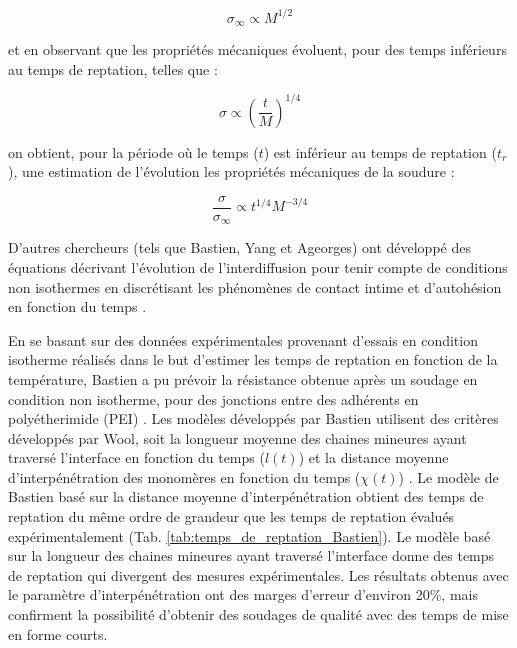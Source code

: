\begin{equation}
\sigma_{\infty} \propto M^{1/2}
\end{equation}

et en observant que les propriétés mécaniques évoluent, pour des temps inférieurs au temps de reptation, telles que \cite{Wool1983} :

\begin{equation}
\sigma \propto \left( \frac{t}{M} \right) ^{1/4}
\end{equation}

on obtient, pour la période où le temps ($t$) est inférieur au temps de reptation ($t_r$), une estimation de l'évolution les propriétés mécaniques de la soudure \cite{Wool1983} : 

\begin{equation}
\frac{\sigma}{\sigma_{\infty}} \propto t^{1/4} M^{-3/4}
\end{equation}

D'autres chercheurs (tels que Bastien, Yang et Ageorges) ont développé des équations décrivant l'évolution de l'interdiffusion pour tenir compte de conditions non isothermes en discrétisant les phénomènes de contact intime et d'autohésion en fonction du temps  \cite{Bastien1991,F.Yang2002,Ageorges1998}. 

En se basant sur des données expérimentales provenant d'essais en condition isotherme réalisés dans le but d'estimer les temps de reptation en fonction de la température, Bastien a pu prévoir la résistance obtenue après un soudage en condition non isotherme, pour des jonctions entre des adhérents en polyétherimide (PEI) \cite{Bastien1991}. 
Les modèles développés par Bastien utilisent des critères développés par Wool, soit la longueur moyenne des chaines mineures ayant traversé l'interface en fonction du temps ($l(t)$) et la distance moyenne d'interpénétration des monomères en fonction du temps ($\chi(t)$) \cite{Wool1983}. 
Le modèle de Bastien basé sur la distance moyenne d'interpénétration obtient des temps de reptation du même ordre de grandeur que les temps de reptation évalués expérimentalement (Tab. \ref{tab:temps_de_reptation_Bastien}). 
Le modèle basé sur la longueur des chaines mineures ayant traversé l'interface donne des temps de reptation qui divergent des mesures expérimentales. 
Les résultats obtenus avec le paramètre d'interpénétration ont des marges d'erreur d'environ 20\%, mais confirment la possibilité d'obtenir des soudages de qualité avec des temps de mise en forme courts.


